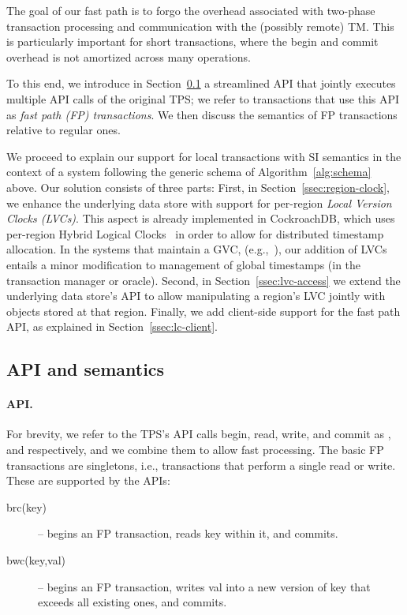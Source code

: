 

The goal of our fast path  is to forgo the overhead associated with two-phase transaction processing and communication with 
the (possibly remote) TM. This is particularly important for short transactions, where the begin and commit overhead is not amortized
across many operations.

To this end, we introduce in Section~\ref{ssec:fast-api} a streamlined API that jointly executes multiple API calls of the original TPS;
we refer to transactions that use this API as \emph{fast path (FP) transactions}. We 
then discuss the semantics of FP transactions relative to regular ones.


We proceed to explain our support for local transactions with SI semantics in the
context of a system following the generic schema of  Algorithm~\ref{alg:schema} above. 
Our solution consists of three parts: First, in Section~\ref{ssec:region-clock}, we enhance the
underlying data store with support for per-region \emph{Local Version Clocks (LVCs)}. 
This aspect is already implemented in CockroachDB, which uses 
per-region Hybrid Logical Clocks~\cite{Kulkarni2014LogicalPC} in order to allow for distributed timestamp allocation. 
In the systems that maintain a GVC, (e.g.,~\cite{Percolator2010,tephra,OmidICDE2014,omid-blog}), our 
addition of  LVCs 
entails a minor modification to management of global timestamps (in the transaction manager or oracle). 
Second, in Section~\ref{ssec:lvc-access}
we extend the underlying data store's API to allow manipulating 
a region's LVC jointly with objects stored at that region. 
Finally, we add client-side support for the fast path API, as explained in Section~\ref{ssec:lc-client}.


\subsection{API and semantics}
\label{ssec:fast-api}

\paragraph{API.}
For brevity, we refer to the TPS's API calls  begin, read, write, and commit as , and  respectively, and 
we combine them to allow fast processing.
The basic FP transactions are singletons, i.e., transactions that perform a single
read or write. These are supported by the APIs: 
\begin{description}
\item[brc(key)] -- begins an FP transaction, reads key within it, and commits.
\item[bwc(key,val)] -- begins an FP transaction,  writes val into a new version of key that exceeds all existing ones, and commits.
\end{description}

